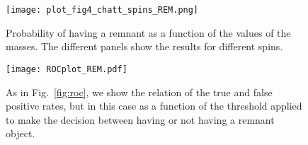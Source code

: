 \begin{figure}
    \texttt{[image: plot\_fig4\_chatt\_spins\_REM.png]}
    \caption{Probability of having a remnant as a function of the values of the masses. The different panels show the results for different spins. }
    \label{fig:m1m2_REM}
\end{figure}

\begin{figure}
	\texttt{[image: ROCplot\_REM.pdf]}
    \caption{As in Fig.~\ref{fig:roc}, we show the relation of the true and false positive rates, but in this case as a function of the threshold applied to make the decision between having or not having a remnant object. }
    \label{fig:roc_REM}
\end{figure}


